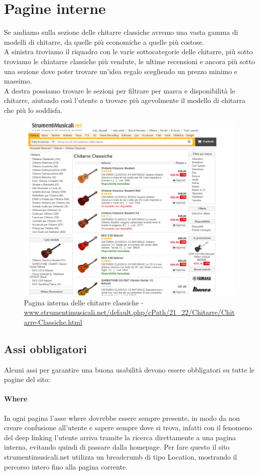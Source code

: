 \documentclass[12pt]{article}
\begin{document}
	\section{Pagine interne}
	Se andiamo sulla sezione delle chitarre classiche avremo una vasta gamma di modelli di chitarre, da quelle più economiche a quelle più costose. \\ A sinistra troviamo il riquadro con le varie sottocategorie delle chitarre, più sotto troviamo le chiatarre classiche più vendute, le ultime recensioni e ancora più sotto una sezione dove poter trovare un'idea regalo scegliendo un prezzo minimo e massimo. \\ A destra possiamo trovare le sezioni per filtrare per marca e disponibilità le chitarre, aiutando così l'utente a trovare più agevolmente il modello di chitarra che più lo soddisfa.
	\begin{figure}[ht!]
		\centering	
		\includegraphics[width=130mm]{images/paginaInterna.png}
		\caption{Pagina interna delle chitarre classiche - \url{www.strumentimusicali.net/default.php/cPath/21_22/Chitarre/Chitarre-Classiche.html}}  
	\end{figure}
	\newpage
	\subsection{Assi obbligatori}
	\vspace{0.5cm}
	Alcuni assi per garantire una buona usabilità devono essere obbligatori su tutte le pagine del sito:
	\paragraph{Where} In ogni pagina l'asse where dovrebbe essere sempre presente, in modo da non creare confusione all'utente e sapere sempre dove si trova, infatti con il fenomeno del deep linking l'utente arriva tramite la ricerca direttamente a una pagina interna, evitando quindi di passare dalla homepage. Per fare questo il sito strumentimusicali.net utilizza un breadcrumb di tipo Location, mostrando il percorso intero fino alla pagina corrente. 
\end{document}
